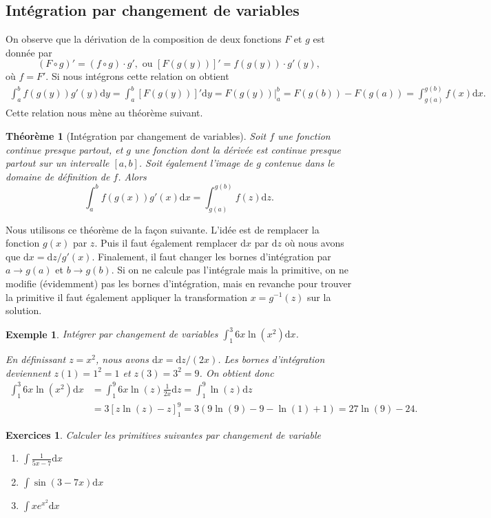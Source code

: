 \documentclass[a4paper,12pt]{book}
\newcommand{\dd}{\mathrm{d}}
\newtheorem*{exemple}{Exemple}
\newtheorem*{exercices}{Exercices}
\newtheorem{theoreme}{Théorème}
\begin{document}
\subsection{Intégration par changement de variables}

On observe que la dérivation de la composition de deux fonctions $F$ et $g$ est donnée par
\begin{equation}
 (F\circ g)'=(f\circ g)\cdot g',\mbox{ ou } [F(g(y))]'=f(g(y))\cdot g'(y),
\end{equation}
où $f=F'$. Si nous intégrons cette relation on obtient
\begin{align*}
 \int_a^b f(g(y))g'(y)\dd y = \int_a^b [F(g(y))]'\dd y=\left.F(g(y))\right|_a^b=F(g(b))-F(g(a))=\int_{g(a)}^{g(b)}f(x)\dd x.
\end{align*}
Cette relation nous mène au théorème suivant.
\begin{theoreme}[Intégration par changement de variables]
Soit $f$ une fonction continue presque partout, et $g$ une fonction dont la dérivée est continue presque partout sur un intervalle 
$[a,b]$. Soit également l'image de $g$ contenue dans le domaine de définition de $f$. Alors
\begin{equation}
 \int_a^b f(g(x))g'(x)\dd x = \int_{g(a)}^{g(b)}f(z)\dd z.
\end{equation}
\end{theoreme}
Nous utilisons ce théorème de la façon suivante. L'idée est de remplacer la fonction $g(x)$ par $z$. Puis il faut également
remplacer $\dd x$ par $\dd z$ où nous avons que $\dd x=\dd z/g'(x)$. Finalement, il faut changer les bornes d'intégration 
par $a\rightarrow g(a)$ et $b\rightarrow g(b)$. Si on ne calcule pas l'intégrale mais la primitive, on ne modifie (évidemment) pas
les bornes d'intégration, mais en revanche pour trouver la primitive il faut également appliquer la transformation
$x=g^{-1}(z)$ sur la solution.
\begin{exemple}
 Intégrer par changement de variables $\int_1^3 6x\ln(x^2)\dd x$.
 
 En définissant $z=x^2$, nous avons $\dd x=\dd z/(2x)$. Les bornes d'intégration deviennent $z(1)=1^2=1$ et $z(3)=3^2=9$.
 On obtient donc
 \begin{align*}
  \int_1^3 6x\ln(x^2)\dd x&=\int_1^9 6x\ln(z)\frac{1}{2x}\dd z=\int_1^9\ln(z)\dd z\nonumber\\
                          &=3\left[z\ln(z)-z\right]_1^9=3(9\ln(9)-9-\ln(1)+1)=27\ln(9)-24.
 \end{align*}

\end{exemple}
\begin{exercices}
Calculer les primitives suivantes par changement de variable
 \begin{enumerate}
  \item $\int \frac{1}{5x-7}\dd x$
  \item $\int \sin(3-7x)\dd x$
  \item $\int x e^{x^2}\dd x$
 \end{enumerate}

\end{exercices}
\end{document}
